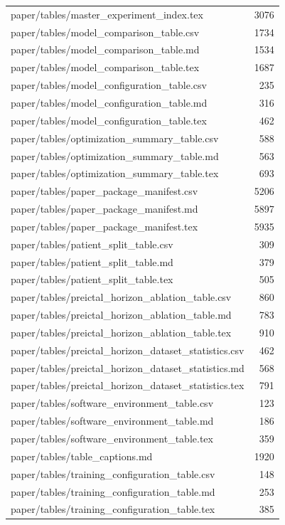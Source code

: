 \begin{tabular}{lr}
paper/tables/master\_experiment\_index.tex & 3076 \\
paper/tables/model\_comparison\_table.csv & 1734 \\
paper/tables/model\_comparison\_table.md & 1534 \\
paper/tables/model\_comparison\_table.tex & 1687 \\
paper/tables/model\_configuration\_table.csv & 235 \\
paper/tables/model\_configuration\_table.md & 316 \\
paper/tables/model\_configuration\_table.tex & 462 \\
paper/tables/optimization\_summary\_table.csv & 588 \\
paper/tables/optimization\_summary\_table.md & 563 \\
paper/tables/optimization\_summary\_table.tex & 693 \\
paper/tables/paper\_package\_manifest.csv & 5206 \\
paper/tables/paper\_package\_manifest.md & 5897 \\
paper/tables/paper\_package\_manifest.tex & 5935 \\
paper/tables/patient\_split\_table.csv & 309 \\
paper/tables/patient\_split\_table.md & 379 \\
paper/tables/patient\_split\_table.tex & 505 \\
paper/tables/preictal\_horizon\_ablation\_table.csv & 860 \\
paper/tables/preictal\_horizon\_ablation\_table.md & 783 \\
paper/tables/preictal\_horizon\_ablation\_table.tex & 910 \\
paper/tables/preictal\_horizon\_dataset\_statistics.csv & 462 \\
paper/tables/preictal\_horizon\_dataset\_statistics.md & 568 \\
paper/tables/preictal\_horizon\_dataset\_statistics.tex & 791 \\
paper/tables/software\_environment\_table.csv & 123 \\
paper/tables/software\_environment\_table.md & 186 \\
paper/tables/software\_environment\_table.tex & 359 \\
paper/tables/table\_captions.md & 1920 \\
paper/tables/training\_configuration\_table.csv & 148 \\
paper/tables/training\_configuration\_table.md & 253 \\
paper/tables/training\_configuration\_table.tex & 385 \\
\bottomrule
\end{tabular}
